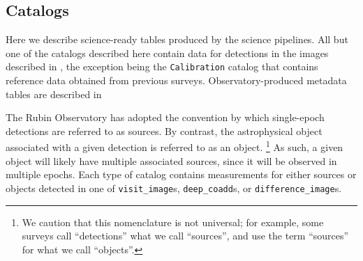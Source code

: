 \subsection{Catalogs}
\label{ssec:catalogs}
Here we describe science-ready tables produced by the science pipelines.
All but one of the catalogs described here contain data for detections in the images described in , the exception being the \texttt{Calibration} catalog that contains reference data obtained from previous surveys.
Observatory-produced metadata tables are described in 


The Rubin Observatory has adopted the convention by which single-epoch detections are referred to as sources.
By contrast, the astrophysical object associated with a given detection is referred to as an object.
\footnote{We caution that this nomenclature is not universal; for example, some surveys call ``detections'' what we call ``sources'', and use the term ``sources'' for what we call ``objects''.}
As such, a given object will likely have multiple associated sources, since it will be observed in multiple epochs.
Each type of catalog contains measurements for either sources or objects detected in one of \texttt{visit\_image}s, \texttt{deep\_coadd}s, or \texttt{difference\_image}s.


